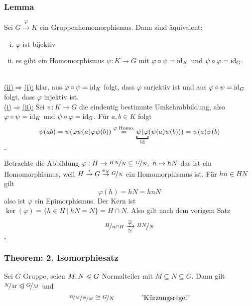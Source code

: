 \subsubsection*{Lemma}
Sei $G\stackrel{\varphi}{\to}K$ ein Gruppenhomomorphismus. 
Dann sind äquivalent:
\begin{enumerate}[(i)]
	\item $\varphi$ ist bijektiv
	\item es gibt ein Homomorphismus $\psi:K\to G$ mit $\varphi \circ \psi=\operatorname{id}_K$ und $\psi\circ\varphi=\operatorname{id}_G$.
\end{enumerate}
\\
\uline{(ii)$\Rightarrow$(i):} klar, aus $\varphi\circ\psi=\operatorname{id}_K$ folgt, dass $\varphi$ surjektiv ist und aus $\varphi\circ\psi=\operatorname{id}_G$ folgt, dass $\varphi$ injektiv ist.\\

\uline{(i)$\Rightarrow$(ii):} Sei $\psi:K\to G$ die eindeutig bestimmte Umkehrabbildung, also $\varphi \circ \psi=\operatorname{id}_K$ und $\psi\circ\varphi=\operatorname{id}_G$. 
Für $a,b\in K$ folgt 
\[
\psi(ab)=\psi(\varphi\psi(a)\varphi\psi(b)) \stackrel{\varphi \text{ Homo.}}{=}\underbracket{\psi(\varphi}_{\id}(\psi(a)\psi(b)))= \psi(a)\psi(b)
\]
\hfill $\square$

Betrachte die Abbildung $\varphi:H\to \nicefrac{HN}{N}\subseteq \nicefrac{G}{N},~h\mapsto hN$ das ist ein Homomorphismus, weil $H\stackrel{i}{\to}G\stackrel{\pi_N}{\to}\nicefrac{G}{N}$ ein Homomorphismus ist. 
Für $hn\in HN$ gilt 
\[
\varphi(h)=hN=hnN
\]
also ist $\varphi$ ein Epimorphismus. 
Der Kern ist $\ker(\varphi)=\{h\in H~|~hN=N \}=H\cap N$. 
Also gilt nach dem vorigem Satz 
\[
\nicefrac{H}{n\cap H}\xrightarrow[\cong]{\overline{\varphi}}\nicefrac{HN}{N}
\]
\hfill $\square$

\subsubsection*{Theorem: 2. Isomorphiesatz}
Sei $G$ Gruppe, seien $M,N\trianglelefteqslant G$ Normalteiler mit $M\subseteq N\subseteq G$. 
Dann gilt $\nicefrac{N}{M}\trianglelefteqslant \nicefrac{G}{M}$ und 
\[
\nicefrac{\nicefrac{G}{M}}{\nicefrac{N}{M}}\cong \nicefrac{G}{N} \qquad\qquad \text{'Kürzungsregel'} 
\]

